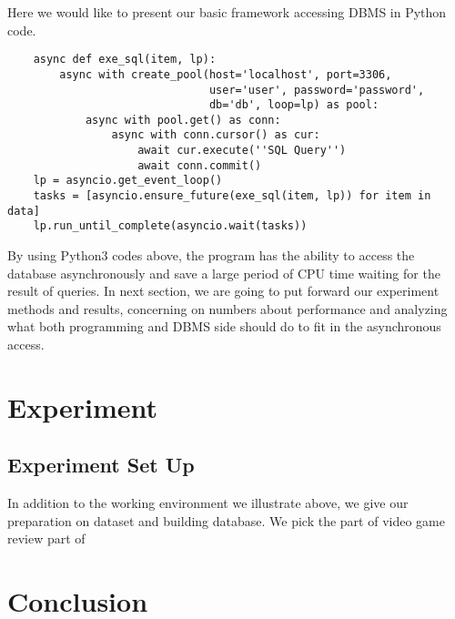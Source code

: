 \documentclass[onecolumn, conference, 12pt]{IEEEtran}
\begin{document}
	Here we would like to present our basic framework accessing DBMS in Python code.
	\lstset{language=python,tabsize=2}
	\begin{lstlisting}
	async def exe_sql(item, lp):
		async with create_pool(host='localhost', port=3306,
							   user='user', password='password',
							   db='db', loop=lp) as pool:
			async with pool.get() as conn:
				async with conn.cursor() as cur:
					await cur.execute(''SQL Query'')
					await conn.commit()
	lp = asyncio.get_event_loop()
	tasks = [asyncio.ensure_future(exe_sql(item, lp)) for item in data]
	lp.run_until_complete(asyncio.wait(tasks))
	\end{lstlisting}
	By using Python3 codes above, the program has the ability to access the database asynchronously and save a large period of CPU time waiting for the result of queries. In next section, we are going to put forward our experiment methods and results, concerning on numbers about performance and analyzing what both programming and DBMS side should do to fit in the asynchronous access. 
	\section{Experiment}
	\subsection{Experiment Set Up}
	In addition to the working environment we illustrate above, we give our preparation on dataset and building database. 
	We pick the part of video game review part of \cite{Amazon}
	\section{Conclusion}
	
	
	
	
\end{document}
